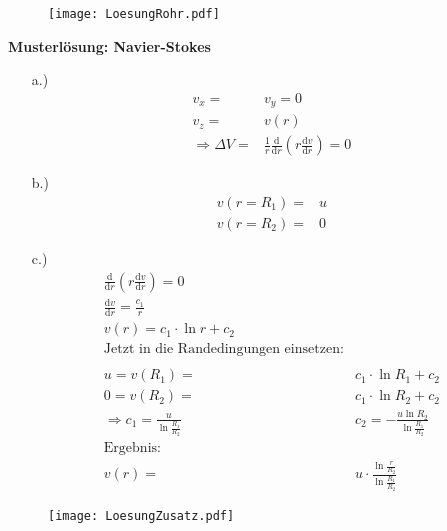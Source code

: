 \documentclass{scrartcl}
\begin{document}
\begin{figure}[h]
  \texttt{[image: LoesungRohr.pdf]}
\end{figure}


\textbf{Musterlösung: Navier-Stokes}

\begin{itemize}
  \item[a.)]
    \begin{align*}
      v_x =& v_y = 0\\
      v_z =& v(r)\\
      \Rightarrow \Delta V =& \frac{1}{r}\frac{\text{d}}{\text{d}r}
      \left(r\frac{\text{d}v}{\text{d}r}\right) = 0
    \end{align*}
  \item[b.)]
    \begin{align*}
      v(r = R_1) =& u\\
      v(r = R_2) =& 0
    \end{align*}
  \item[c.)]
    \begin{align*}
      \frac{\text{d}}{\text{d}r}
      \left(r\frac{\text{d}v}{\text{d}r}\right) = 0\\
      \frac{\text{d}v}{\text{d}r} = \frac{c_1}{r}\\
      v(r) = c_1\cdot \ln{r} + c_2\\
      \text{Jetzt in die Randedingungen einsetzen:}\\
      \\
      u = v(R_1) =& c_1 \cdot \ln{R_1} + c_2\\
      0 = v(R_2) =& c_1 \cdot \ln{R_2} + c_2\\
      \Rightarrow c_1 = \frac{u}{\ln{\frac{R_1}{R_2}}} &
      c_2 = -\frac{u\ln{R_2}}{\ln{\frac{R_1}{R_2}}}\\
      \text{Ergebnis:}\\
      v(r) =& u\cdot\frac{\ln{\frac{r}{R_2}}}{\ln{\frac{R_1}{R_2}}}
    \end{align*}
\end{itemize}

\begin{figure}
  \texttt{[image: LoesungZusatz.pdf]}
\end{figure}
\end{document}
